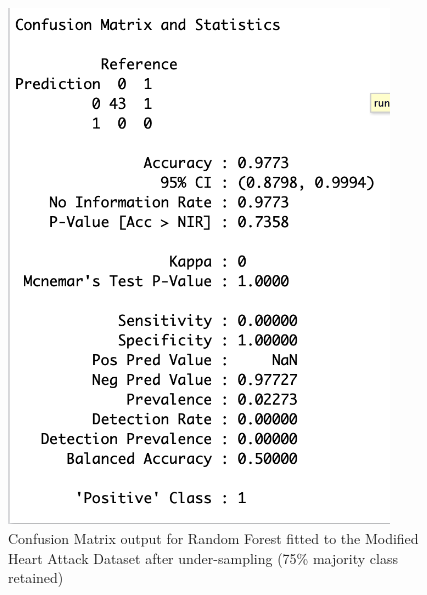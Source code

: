 \begin{figure}[!htbp]
    \centering
    \begin{minipage}{0.45\textwidth}
        \centering
        \includegraphics[width=0.9\textwidth]{ThesisTemplate/appendix/images/Chapter5Appendix/ConfusionMatrix75/ModifiedHA.png}
        \caption{Confusion Matrix output for Random Forest fitted to the Modified Heart Attack Dataset after under-sampling (75\% majority class retained)}
        \label{fig:matrixmodHA75}
    \end{minipage}\hfill
    \begin{minipage}{0.45\textwidth}
        \centering

\end{minipage}
\end{figure}
